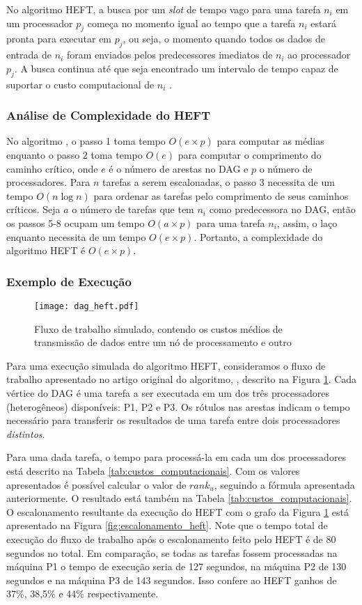 No algoritmo HEFT, a busca por um \emph{slot} de tempo vago
para uma tarefa $n_i$ em um processador $p_j$ começa no
momento igual ao tempo que a tarefa $n_i$ estará pronta para
executar em $p_j$, ou seja, o momento quando todos os dados
de entrada de $n_i$ foram enviados pelos predecessores imediatos
de $n_i$ ao processador $p_j$. A busca continua até que seja
encontrado um intervalo de tempo capaz de suportar o custo
computacional de $n_i$ \cite{topcoglu:heft}.


\subsubsection{Análise de Complexidade do HEFT}
No algoritmo , o passo 1 toma tempo
$O(e \times p)$ para computar as médias enquanto o passo 2 toma tempo $O(e)$ para 
computar o comprimento do caminho crítico, onde $e$ é o número de arestas no 
DAG e $p$ o número de processadores. Para $n$ tarefas a serem escalonadas, 
o passo 3 necessita de um tempo $O(n \log n)$ para ordenar as tarefas pelo
comprimento de seus caminhos críticos. Seja $a$ o número de tarefas que tem
$n_i$ como predecessora no DAG, então os passos 5-8 ocupam um tempo
$O(a \times p)$ para uma tarefa $n_i$, assim, o laço enquanto necessita de um 
tempo $O(e \times p)$. Portanto, a complexidade do algoritmo HEFT é  $O(e
\times p)$.

\subsubsection{Exemplo de Execução}
\begin{figure}[ht]
\centering
\texttt{[image: dag\_heft.pdf]}
\caption{Fluxo de trabalho simulado, contendo os custos médios de
transmissão de dados entre um nó de processamento e outro}
\label{fig:dag_heft}
\end{figure}

Para uma execução simulada do algoritmo HEFT, consideramos o fluxo de trabalho
apresentado no artigo original do algoritmo, \cite{topcoglu:heft}, descrito na
Figura \ref{fig:dag_heft}. Cada vértice do DAG é uma tarefa a ser executada em
um dos três processadores (heterogêneos) disponíveis: P1, P2 e P3. Os rótulos
nas arestas indicam o tempo necessário para transferir os resultados de uma
tarefa entre dois processadores \emph{distintos}.

Para uma dada tarefa, o tempo para processá-la em cada um dos processadores está
descrito na Tabela \ref{tab:custos_computacionais}. Com os valores apresentados
é possível calcular o valor de $rank_u$, seguindo a fórmula apresentada
anteriormente. O resultado está também na Tabela
\ref{tab:custos_computacionais}. O escalonamento resultante da execução do HEFT
com o grafo da Figura \ref{fig:dag_heft} está apresentado na Figura
\ref{fig:escalonamento_heft}. Note que o tempo total de execução do fluxo de
trabalho após o escalonamento feito pelo HEFT é de 80 segundos no total. Em
comparação, se todas as tarefas fossem processadas na máquina P1 o tempo de
execução seria de 127 segundos, na máquina P2 de 130 segundos e na máquina P3 de
143 segundos. Isso confere ao HEFT ganhos de 37\%, 38,5\% e 44\%
respectivamente.

